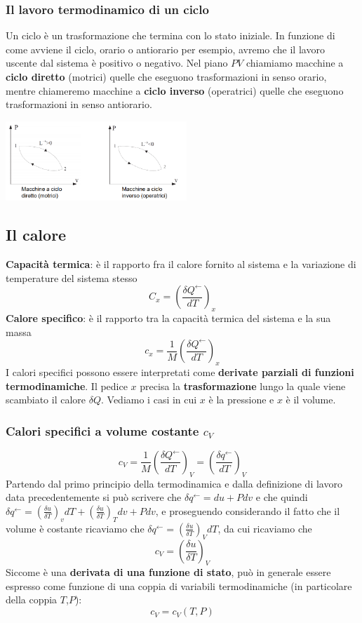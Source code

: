 \subsubsection{Il lavoro termodinamico di un ciclo}
Un ciclo è un trasformazione che termina con lo stato iniziale. In funzione di come avviene il ciclo, orario o antiorario per esempio, avremo che il lavoro uscente dal sistema è positivo o negativo. Nel
piano $PV$ chiamiamo macchine a \textbf{ciclo diretto} (motrici) quelle che eseguono trasformazioni in senso orario, mentre chiameremo macchine a \textbf{ciclo inverso} (operatrici) quelle che eseguono trasformazioni in senso antiorario.
\begin{center}
    \includegraphics[height=3cm]{../L03/img5.PNG}
\end{center}
\subsection{Il calore}
\textbf{Capacità termica}: è il rapporto fra il calore fornito al sistema e la variazione di temperature del sistema stesso
\[
    C_x = \left(\frac{\delta Q^\leftarrow }{d T}\right)_x
\]
\textbf{Calore specifico}: è il rapporto tra la capacità termica del sistema e la sua massa
\[
    c_x = \frac{1}{M}\left(\frac{\delta Q^\leftarrow }{dT}\right)_x
\]
I calori specifici possono essere interpretati come \textbf{derivate parziali di funzioni termodinamiche}.\newline
\newline
Il pedice $x$ precisa la \textbf{trasformazione} lungo la quale viene scambiato il calore $\delta Q$. Vediamo i casi in cui $x$ è la pressione e $x$ è il volume.
\subsubsection{Calori specifici a volume costante $c_V$}
\[
    c_V =\frac{1}{M}\left(\frac{\delta Q^\leftarrow }{dT}\right)_V = \left(\frac{\delta q^\leftarrow }{dT}\right)_V
\]
Partendo dal primo principio della termodinamica e dalla definizione di lavoro data precedentemente si può scrivere che $\delta q^\leftarrow  = d u + Pdv$ e che quindi $\delta q^\leftarrow  = \left(\frac{\delta u}{\delta T}\right)_vdT + \left(\frac{\delta u}{\delta T}\right)_T dv + Pdv$, e proseguendo considerando il fatto che il volume è costante ricaviamo che $\delta q^\leftarrow  = \left(\frac{\delta u}{\delta T}\right)_VdT$, da cui ricaviamo che 
\[
    c_V = \left( \frac{\delta u}{\delta T} \right)_V
\]
Siccome è una \textbf{derivata di una funzione di stato}, può in generale essere espresso come funzione di una coppia di variabili termodinamiche (in particolare della coppia $T$,$P$):
\[
    c_V = c_V(T,P)
\]

